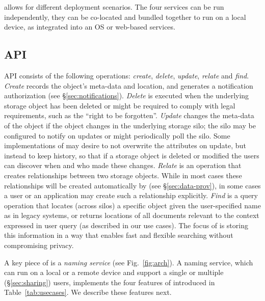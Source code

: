 \system allows for different deployment scenarios. The four services can be run independently, they can be co-located and bundled together to run on a local device, as integrated into an OS or web-based services.

\subsection{\system API}
\system API consists of the following operations: \emph{create}, \emph{delete}, \emph{update}, \emph{relate} and \emph{find}. 
\emph{Create} records the object’s meta-data and location, and generates a notification authorization (see \S\ref{sec:notifications}). 
%
\emph{Delete} is executed when the underlying storage object has  been deleted or might be required to comply with legal requirements, such as the “right to be forgotten”. 
%
\emph{Update} changes the meta-data of the object if the object changes in the underlying storage silo; the silo may be configured to notify \system on updates or \system might periodically poll the silo. Some implementations of \system may desire to not overwrite the attributes on update, but instead to keep history, so that if a storage object is deleted or modified the users can discover when and  who made these changes. 
%
\emph{Relate} is an operation that creates relationships between two storage objects. While in most cases these relationships will be created automatically by  \system  (see \S\ref{sec:data-prov}), in some cases a user or an application may create such a relationship explicitly. 
%
\emph{Find} is a query operation that locates (across silos) a specific object given the user-specified name as in legacy systems, or returns locations of all documents relevant to the context expressed in user query (as described in our use cases). The focus of \system is storing this information in a way that enables fast and flexible searching without compromising privacy. 

A key piece of \system is a \emph{naming service} (see Fig.~\ref{fig:arch}). A naming service, which can run on a local or a remote device and support a single or multiple (\S\ref{sec:sharing}) users, implements the four features of \system  introduced in Table~\ref{tab:usecases}. We describe these features  next. 

